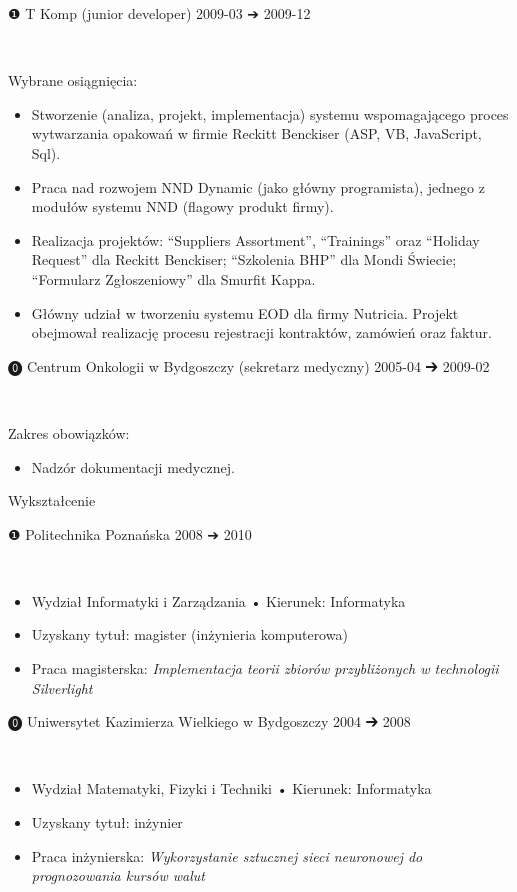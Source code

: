 \documentclass[a4paper,11pt]{report}
\newcommand{\cvEnuItemBox}[1]
{%
	\hspace{26pt}\parbox{.93\textwidth}{#1}
}
\newcommand{\cvSectionHeader}[1]
{%
	\setlength{\fboxsep}{0pt}%
	\setlength{\fboxrule}{0pt}%
	\colorbox{sectionbg}
	{%
		\color{sectionfg}%
		\begin{minipage}[t]{\textwidth}
			\begin{flushright}\vspace{12pt}
			{\fontsize{19pt}{1em}\addfontfeature{LetterSpace=7.0}\selectfont #1\hspace*{16pt}}\vspace{2pt}
			\end{flushright}%
		\end{minipage}%
	}%
}
\newcommand{\cvSectionEntry}[1]
{%
	\setlength{\fboxsep}{0pt}%
	\setlength{\fboxrule}{0pt}%
	\colorbox{sectionbg}
	{%
		\color{sectionfg}%
		\begin{minipage}[t]{\textwidth}
			#1 %
		\end{minipage}%
	}%
}
\newcommand{\cvSectionEntryHeader}[4]
{%
	\vspace{8pt}\hspace{26pt}\parbox{.93\textwidth}
	{%
		\fontsize{13pt}{1em}\selectfont #1 \hspace{2pt} #2 \hfill #3 {\segoesym ➔} #4 %
	}\\
}
\newcommand{\cvSectionEntryBody}[2]
{%
	\cvEnuItemBox{\hspace{27pt}#1#2}
}
\begin{document}
\cvSectionEntry
{
	\cvSectionEntryHeader{❶}{T Komp (junior developer)}{2009-03}{2009-12}

	\cvSectionEntryBody{Wybrane osiągnięcia:}
	{
		\begin{itemize}
			\setlength\itemsep{0em}
			\item Stworzenie (analiza, projekt, implementacja) systemu wspomagającego proces wytwarzania opakowań w firmie Reckitt Benckiser (ASP, VB, JavaScript, Sql).
			\item Praca nad rozwojem NND Dynamic (jako główny programista), jednego z modułów systemu NND (flagowy produkt firmy).
			\item Realizacja projektów: “Suppliers Assortment”, “Trainings” oraz “Holiday Request” dla Reckitt Benckiser; “Szkolenia BHP” dla Mondi Świecie; “Formularz Zgłoszeniowy” dla Smurfit Kappa.
			\item Główny udział w tworzeniu systemu EOD dla firmy Nutricia. Projekt obejmował realizację procesu rejestracji kontraktów, zamówień oraz faktur.
		\end{itemize}
	}
}

\cvSectionEntry
{
	\cvSectionEntryHeader{⓿}{Centrum Onkologii w Bydgoszczy (sekretarz medyczny)}{2005-04}{2009-02}

	\cvSectionEntryBody{Zakres obowiązków:}
	{
		\begin{itemize}
			\setlength\itemsep{0em}
			\item Nadzór dokumentacji medycznej.
		\end{itemize}
	}
}

\cvSectionHeader{Wykształcenie}

\cvSectionEntry
{
	\cvSectionEntryHeader{❶}{Politechnika Poznańska}{2008}{2010}

	\cvSectionEntryBody{}
	{
		\begin{itemize}
			\setlength\itemsep{0em}
			\item Wydział Informatyki i Zarządzania • Kierunek: Informatyka
			\item Uzyskany tytuł: magister (inżynieria komputerowa)
			\item Praca magisterska: \textit{Implementacja teorii zbiorów przybliżonych w technologii Silverlight}
		\end{itemize}
	}
}

\cvSectionEntry
{
	\cvSectionEntryHeader{⓿}{Uniwersytet Kazimierza Wielkiego w Bydgoszczy}{2004}{2008}

	\cvSectionEntryBody{}
	{
		\begin{itemize}
			\setlength\itemsep{0em}
			\item Wydział Matematyki, Fizyki i Techniki • Kierunek: Informatyka
			\item Uzyskany tytuł: inżynier
			\item Praca inżynierska: \textit{Wykorzystanie sztucznej sieci neuronowej do prognozowania kursów walut}
		\end{itemize}
	}
}
\end{document}
